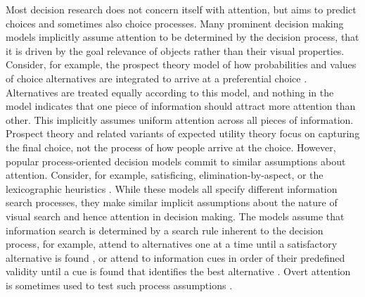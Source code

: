 Most decision research does not concern itself with attention, but aims to predict choices and sometimes also choice processes. Many prominent decision making models implicitly assume attention to be determined by the decision process, that it is driven by the goal relevance of objects rather than their visual properties. Consider, for example, the prospect theory model of how probabilities and values of choice alternatives are integrated to arrive at a preferential choice \citep{tversky1979}. Alternatives are treated equally according to this model, and nothing in the model indicates that one piece of information should attract more attention than other. This implicitly assumes uniform attention across all pieces of information. Prospect theory and related variants of expected utility theory focus on capturing the final choice, not the process of how people arrive at the choice. However, popular process-oriented decision models commit to similar assumptions about attention. Consider, for example, satisficing, elimination-by-aspect, or the lexicographic heuristics \citep{payne1988, simon1956a}. While these models all specify different information search processes, they make similar implicit assumptions about the nature of visual search and hence attention in decision making. The models assume that information search is determined by a search rule inherent to the decision process, for example, attend to alternatives one at a time until a satisfactory alternative is found \citep{stuttgen2012}, or attend to information cues in order of their predefined validity until a cue is found that identifies the best alternative \citep{krefeld-schwalb2019a}. Overt attention is sometimes used to test such process assumptions \citep{gloeckner2011a}.

